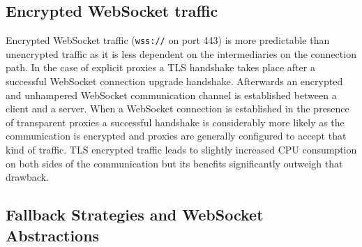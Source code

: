 \newpage
\subsection{Encrypted WebSocket traffic}

Encrypted WebSocket traffic (\texttt{wss://} on port 443) is more predictable than unencrypted traffic as it is less dependent on the intermediaries on the connection path. In the case of explicit proxies a TLS handshake takes place after a successful WebSocket connection upgrade handshake. Afterwards an encrypted and unhampered WebSocket communication channel is established between a client and a server. When a WebSocket connection is established in the presence of transparent proxies a successful handshake is considerably more likely as the communication is encrypted and proxies are generally configured to accept that kind of traffic. TLS encrypted traffic leads to slightly increased CPU consumption on both sides of the communication but its benefits significantly outweigh that drawback.

\subsection{Fallback Strategies and WebSocket Abstractions}

